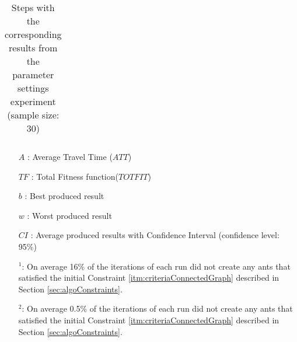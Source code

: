 \begin{sidewaystable}
\begin{tabular}{|l|l|l|l|l||c|c|c|c|c|c|c|}
    
 
  
    \hline
    \end{tabular}
    \caption {Steps with the corresponding results from the parameter settings experiment (sample size: 30)}
    \tiny
    \begin{itemize}[noitemsep]
    \item[$A$ :] Average Travel Time ($ATT$)
    \item[$TF$ :] Total Fitness function($TOTFIT$)
    \item[$b$ :] Best produced result
    \item[$w$ :] Worst produced result
    \item[$CI$ :] Average produced results with Confidence Interval (confidence level: 95\%)
    \item[$^1$:] On average 16\% of the iterations of each run did not create any ants that satisfied the initial Constraint \ref{itm:criteriaConnectedGraph} described in Section \vref{sec:algoConstraints}.
    \item[$^2$:] On average 0.5\% of the iterations of each run did not create any ants that satisfied the initial Constraint \ref{itm:criteriaConnectedGraph} described in Section \vref{sec:algoConstraints}.
    \end{itemize}
    \label{table:pm1}
\end{sidewaystable}

